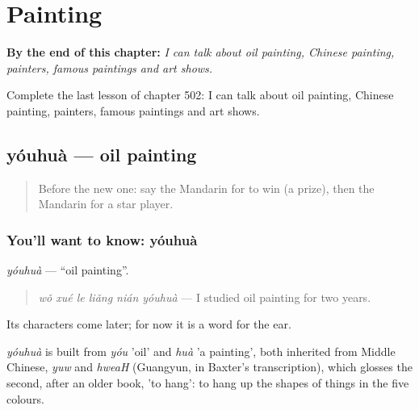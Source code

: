 
\chapter{Painting}
\label{ch:zh-painting}

\begin{chapteropening}
\textbf{By the end of this chapter:} \emph{I can talk about oil painting, Chinese painting, painters, famous paintings and art shows.}

Complete the last lesson of chapter 502: I can talk about oil painting, Chinese painting, painters, famous paintings and art shows.
\end{chapteropening}

\section[yóuhuà]{yóuhuà — oil painting}

\label{lesson:ZH-C502-youhua}



\begin{quote}
Before the new one: say the Mandarin for to win (a prize), then the Mandarin for a star player.
\end{quote}

\subsection*{You'll want to know: yóuhuà}
\emph{yóuhuà} — \textquotedblleft{}oil painting\textquotedblright{}.

\begin{quote}
\emph{wǒ xué le liǎng nián yóuhuà} — I studied oil painting for two years.
\end{quote}

Its characters come later; for now it is a word for the ear.

\begin{cousinweb}
\emph{yóuhuà} is built from \emph{yóu} 'oil' and \emph{huà} 'a painting', both inherited from Middle Chinese, \emph{yuw} and \emph{hweaH} (Guangyun, in Baxter's transcription), which glosses the second, after an older book, 'to hang': to hang up the shapes of things in the five colours.
\end{cousinweb}

